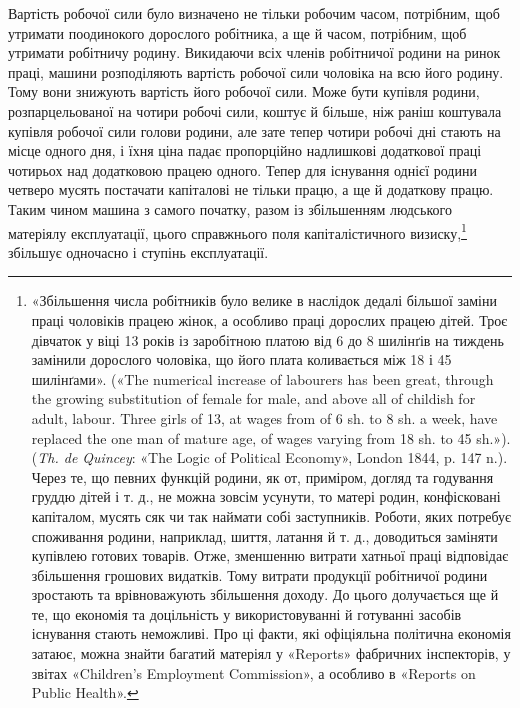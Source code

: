 Вартість робочої сили було визначено не тільки робочим
часом, потрібним, щоб утримати поодинокого дорослого робітника,
а ще й часом, потрібним, щоб утримати робітничу родину.
Викидаючи всіх членів робітничої родини на ринок праці, машини
розподіляють вартість робочої сили чоловіка на всю його родину.
Тому вони знижують вартість його робочої сили. Може бути купівля
родини, розпарцельованої на чотири робочі сили, коштує й
більше, ніж раніш коштувала купівля робочої сили голови родини,
але зате тепер чотири робочі дні стають на місце одного дня, і їхня
ціна падає пропорційно надлишкові додаткової праці чотирьох
над додатковою працею одного. Тепер для існування однієї родини
четверо мусять постачати капіталові не тільки працю, а ще й
додаткову працю. Таким чином машина з самого початку, разом
із збільшенням людського матеріялу експлуатації, цього справжнього
поля капіталістичного визиску,\footnote{
«Збільшення числа робітників було велике в наслідок дедалі
більшої заміни праці чоловіків працею жінок, а особливо праці дорослих
працею дітей. Троє дівчаток у віці 13 років із заробітною платою від 6
до 8 шилінґів на тиждень замінили дорослого чоловіка, що його плата
коливається між 18 і 45 шилінґами». («The numerical increase of labourers
has been great, through the growing substitution of female for male, and
above all of childish for adult, labour. Three girls of 13, at wages from of
6 sh. to 8 sh. a week, have replaced the one man of mature age, of wages
varying from 18 sh. to 45 sh.»). (\emph{Th. de Quincey}: «The Logic of Political
Economy», London 1844, p. 147 n.). Через те, що певних функцій родини,
як от, приміром, догляд та годування груддю дітей і т. д., не можна зовсім
усунути, то матері родин, конфісковані капіталом, мусять сяк чи так наймати собі заступників. Роботи, яких потребує споживання родини,
наприклад, шиття, латання й т. д., доводиться заміняти купівлею готових
товарів. Отже, зменшенню витрати хатньої праці відповідає збільшення
грошових видатків. Тому витрати продукції робітничої родини зростають
та врівноважують збільшення доходу. До цього долучається ще й те, що
економія та доцільність у використовуванні й готуванні засобів існування
стають неможливі. Про ці факти, які офіціяльна політична економія
затаює, можна знайти багатий матеріял у «Reports» фабричних інспекторів,
у звітах «Children’s Employment Commission», а особливо в «Reports
on Public Health».
} збільшує одночасно і ступінь експлуатації.

